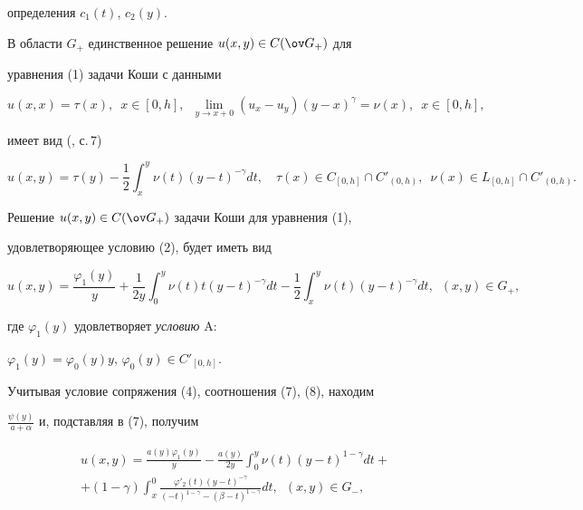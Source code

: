 определения $c_1(t)$, $c_2(y)$. 


 


В области $G_+$ единственное решение $u(x,y)\in C(\ov G_+)$ для 


уравнения (1) задачи Коши с данными 


$$ 


u(x,x)=\tau(x),\ \; x\in[0,h],\ \; 


\lim_{y\to x+0}(u_x-u_y)(y-x)^\gamma=\nu(x), 


\ \; x\in[0,h], 


$$ 


имеет вид (\cite{1}, с.\,7) 


\begin{equation} 


u(x,y)=\tau(y)-\frac{1}{2}\int^y_x \nu(t)(y-t)^{-\gamma}dt,\quad 


\tau(x)\in C_{[0,h]}\cap C'_{(0,h)}, 


\ \; \nu(x)\in L_{[0,h]}\cap C'_{(0,h)}. 


\end{equation} 


 


Решение $u(x,y)\in C(\ov G_+)$ задачи Коши для уравнения (1), 


удовлетворяющее условию (2), будет иметь вид 


\begin{equation} 


u(x,y)=\frac{\varphi_1(y)}{y}+\frac{1}{2y}\int^y_0 


\nu(t)t(y-t)^{-\gamma}dt-\frac{1}{2}\int^y_x 


\nu(t)(y-t)^{-\gamma}dt,\ \; (x,y)\in G_+, 


\end{equation} 


где $\varphi_1(y)$ удовлетворяет {\it условию} A: 


$\varphi_1(y)=\varphi_0(y)y$, $\varphi_0(y)\in C'_{[0,h]}$. 


 


Учитывая условие сопряжения (4), соотношения (7), (8), находим 


$\frac{\psi(y)}{a+\alpha}$ и, подставляя в (7), получим 


\begin{multline} 


u(x,y)=\frac{a(y)\varphi_1(y)}{y}-\frac{a(y)}{2y} 


\int^y_0 \nu(t)(y-t)^{1-\gamma}dt+\\


+(1-\gamma)\int^0_x 


\frac{\varphi'_2(t)(y-t)^{-\gamma}} 


{(-t)^{1-\gamma}-(\beta-t)^{1-\gamma}}dt,\ \; (x,y)\in G_-, 


\end{multline} 


